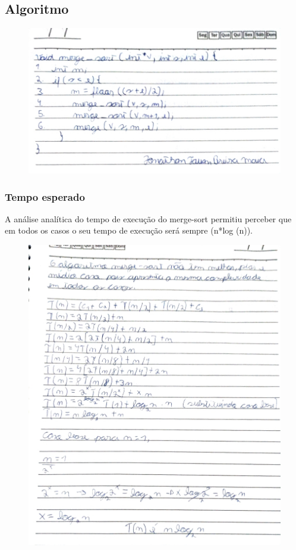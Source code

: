 \subsection{Algoritmo}
\begin{figure}[h]
    \centering
    \includegraphics[width=0.76\linewidth]{Imagens/merge.jpg}
\end{figure}

\newpage
\subsubsection{Tempo esperado}
A análise analítica do tempo de execução do merge-sort permitiu perceber que em todos os casos o seu tempo de execução será sempre (n*log (n)).
\begin{figure}[h]
    \centering
    \includegraphics[width=0.76\linewidth]{Imagens/calculo-merge.jpg}
\end{figure}